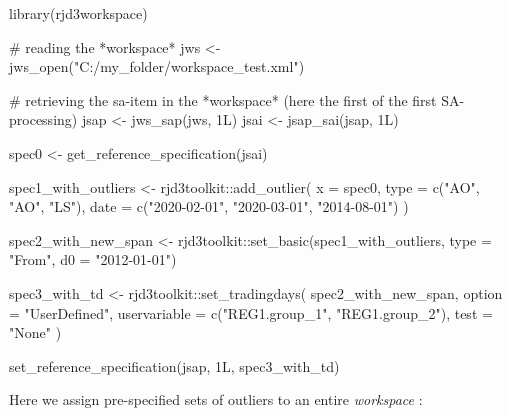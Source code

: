 \documentclass[
  letterpaper,
  DIV=11,
  numbers=noendperiod]{scrreprt}
\newenvironment{Shaded}{\begin{snugshade}}{\end{snugshade}}
\newcommand{\AttributeTok}[1]{\textcolor[rgb]{0.40,0.45,0.13}{#1}}
\newcommand{\CommentTok}[1]{\textcolor[rgb]{0.37,0.37,0.37}{#1}}
\newcommand{\FunctionTok}[1]{\textcolor[rgb]{0.28,0.35,0.67}{#1}}
\newcommand{\NormalTok}[1]{\textcolor[rgb]{0.00,0.23,0.31}{#1}}
\newcommand{\OtherTok}[1]{\textcolor[rgb]{0.00,0.23,0.31}{#1}}
\newcommand{\SpecialCharTok}[1]{\textcolor[rgb]{0.37,0.37,0.37}{#1}}
\newcommand{\StringTok}[1]{\textcolor[rgb]{0.13,0.47,0.30}{#1}}
\begin{document}
\begin{Shaded}
\begin{Highlighting}[]
\FunctionTok{library}\NormalTok{(rjd3workspace)}

\CommentTok{\# reading the *workspace* }
\NormalTok{jws }\OtherTok{\textless{}{-}} \FunctionTok{jws\_open}\NormalTok{(}\StringTok{"C:/my\_folder/workspace\_test.xml"}\NormalTok{)}

\CommentTok{\# retrieving the sa{-}item in the *workspace* (here the first of the first SA{-}processing)}
\NormalTok{jsap }\OtherTok{\textless{}{-}} \FunctionTok{jws\_sap}\NormalTok{(jws, 1L)}
\NormalTok{jsai }\OtherTok{\textless{}{-}} \FunctionTok{jsap\_sai}\NormalTok{(jsap, 1L)}

\NormalTok{spec0 }\OtherTok{\textless{}{-}} \FunctionTok{get\_reference\_specification}\NormalTok{(jsai)}

\NormalTok{spec1\_with\_outliers }\OtherTok{\textless{}{-}}\NormalTok{ rjd3toolkit}\SpecialCharTok{::}\FunctionTok{add\_outlier}\NormalTok{(}
    \AttributeTok{x =}\NormalTok{ spec0,}
    \AttributeTok{type =} \FunctionTok{c}\NormalTok{(}\StringTok{"AO"}\NormalTok{, }\StringTok{"AO"}\NormalTok{, }\StringTok{"LS"}\NormalTok{),}
    \AttributeTok{date =} \FunctionTok{c}\NormalTok{(}\StringTok{"2020{-}02{-}01"}\NormalTok{, }\StringTok{"2020{-}03{-}01"}\NormalTok{, }\StringTok{"2014{-}08{-}01"}\NormalTok{)}
\NormalTok{)}

\NormalTok{spec2\_with\_new\_span }\OtherTok{\textless{}{-}}\NormalTok{ rjd3toolkit}\SpecialCharTok{::}\FunctionTok{set\_basic}\NormalTok{(spec1\_with\_outliers, }\AttributeTok{type =} \StringTok{"From"}\NormalTok{, }\AttributeTok{d0 =} \StringTok{"2012{-}01{-}01"}\NormalTok{)}

\NormalTok{spec3\_with\_td }\OtherTok{\textless{}{-}}\NormalTok{ rjd3toolkit}\SpecialCharTok{::}\FunctionTok{set\_tradingdays}\NormalTok{(}
\NormalTok{    spec2\_with\_new\_span,}
    \AttributeTok{option =} \StringTok{"UserDefined"}\NormalTok{,}
    \AttributeTok{uservariable =} \FunctionTok{c}\NormalTok{(}\StringTok{"REG1.group\_1"}\NormalTok{, }\StringTok{"REG1.group\_2"}\NormalTok{),}
    \AttributeTok{test =} \StringTok{"None"}
\NormalTok{)}

\FunctionTok{set\_reference\_specification}\NormalTok{(jsap, 1L, spec3\_with\_td)}
\end{Highlighting}
\end{Shaded}

Here we assign pre-specified sets of outliers to an entire
\emph{workspace} :
\end{document}
